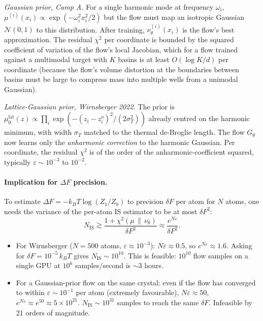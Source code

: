 \documentclass[11pt,letterpaper]{article}
\theoremstyle{plain}
\begin{document}
\emph{Gaussian prior, Camp A.} For a single harmonic mode at frequency $\omega_i$,
$\mu^{(i)}(x_i)\propto\exp(-\omega_i^2 x_i^2/2)$ but the flow must map an
isotropic Gaussian $\mathcal N(0,1)$ to this distribution. After training,
$\nu_\theta^{(i)}(x_i)$ is the flow's best approximation. The residual
$\chi^2$ per coordinate is bounded by the squared coefficient of variation of
the flow's local Jacobian, which for a flow trained against a multimodal
target with $K$ basins is at least $O(\log K /d)$ per coordinate (because the
flow's volume distortion at the boundaries between basins must be large to
compress mass into multiple wells from a unimodal Gaussian).

\emph{Lattice-Gaussian prior, Wirnsberger 2022.} The prior is
$\mu_0^{\mathrm{lat}}(z) \propto \prod_i \exp(-(z_i - z_i^o)^2/(2\sigma_T^2))$
already centred on the harmonic minimum, with width $\sigma_T$ matched to the
thermal de-Broglie length. The flow $G_\theta$ now learns only the
\emph{anharmonic correction} to the harmonic Gaussian. Per coordinate, the
residual $\chi^2$ is of the order of the anharmonic-coefficient squared,
typically $\varepsilon \sim 10^{-3}$ to $10^{-2}$.

\paragraph{Implication for $\Delta F$ precision.} To estimate
$\Delta F = -k_B T \log(Z_1/Z_0)$ to precision $\delta F$ per atom for $N$
atoms, one needs the variance of the per-atom IS estimator to be at most
$\delta F^2$:
\[
  N_{\mathrm{IS}} \gtrsim \frac{1+\chi^2(\mu\,\|\,\nu_\theta)}{\delta F^2} \approx \frac{e^{N \varepsilon}}{\delta F^2}.
\]
\begin{itemize}\setlength{\itemsep}{2pt}
  \item For Wirnsberger ($N=500$ atoms, $\varepsilon\approx 10^{-3}$):
    $N \varepsilon \approx 0.5$, so $e^{N\varepsilon}\approx 1.6$. Asking for
    $\delta F = 10^{-5}\,k_B T$ gives $N_{\mathrm{IS}} \sim 10^{10}$. This is
    feasible: $10^{10}$ flow samples on a single GPU at $10^6$ samples/second
    is $\sim 3$ hours.
  \item For a Gaussian-prior flow on the same crystal: even if the flow has
    converged to within $\varepsilon \sim 10^{-1}$ per atom (extremely
    favourable), $N\varepsilon \approx 50$, $e^{N\varepsilon}\approx e^{50}
    \approx 5\times 10^{21}$. $N_{\mathrm{IS}} \sim 10^{31}$ samples to reach the
    same $\delta F$. Infeasible by 21 orders of magnitude.
\end{itemize}
\end{document}
